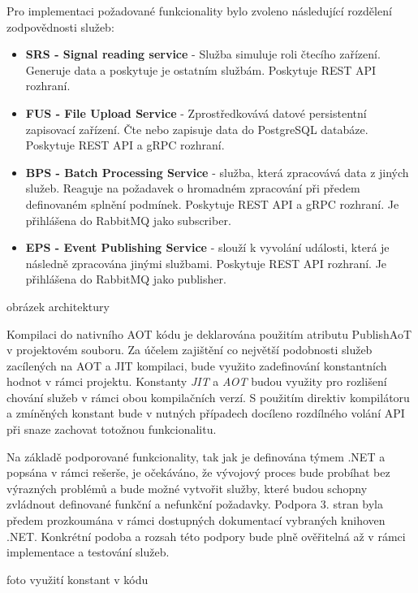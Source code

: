 
Pro implementaci požadované funkcionality bylo zvoleno následující rozdělení zodpovědnosti služeb:

\begin{itemize}
    \item \textbf{SRS - Signal reading service} - Služba simuluje roli čtecího zařízení. Generuje data a poskytuje je ostatním službám. Poskytuje REST API rozhraní.
    \item \textbf{FUS - File Upload Service} - Zprostředkovává datové persistentní zapisovací zařízení. Čte nebo zapisuje data do PostgreSQL databáze. Poskytuje REST API a gRPC rozhraní.
    \item \textbf{BPS - Batch Processing Service} - služba, která zpracovává data z jiných služeb. Reaguje na požadavek o hromadném zpracování při předem definovaném splnění podmínek. Poskytuje REST API a gRPC rozhraní. Je přihlášena do RabbitMQ jako subscriber.
    \item \textbf{EPS - Event Publishing Service} - slouží k vyvolání události, která je následně zpracována jinými službami. Poskytuje REST API rozhraní. Je přihlášena do RabbitMQ jako publisher.
\end{itemize}

obrázek architektury

Kompilaci do nativního AOT kódu je deklarována použitím atributu PublishAoT v projektovém souboru. Za účelem zajištění co největší podobnosti služeb zacílených na AOT a JIT kompilaci, bude využito zadefinování konstantních hodnot v rámci projektu. Konstanty \emph{JIT} a \emph{AOT} budou využity pro rozlišení chování služeb v rámci obou kompilačních verzí. S použitím direktiv kompilátoru a zmíněných konstant bude v nutných případech docíleno rozdílného volání API při snaze zachovat totožnou funkcionalitu.


Na základě podporované funkcionality, tak jak je definována týmem .NET a popsána v rámci rešerše, je očekáváno, že vývojový proces bude probíhat bez výrazných problémů a bude možné vytvořit služby, které budou schopny zvládnout definované funkční a nefunkční požadavky. Podpora 3. stran byla předem prozkoumána v rámci dostupných dokumentací vybraných knihoven .NET. Konkrétní podoba a rozsah této podpory bude plně ověřitelná až v rámci implementace a testování služeb.

foto využití konstant v kódu


